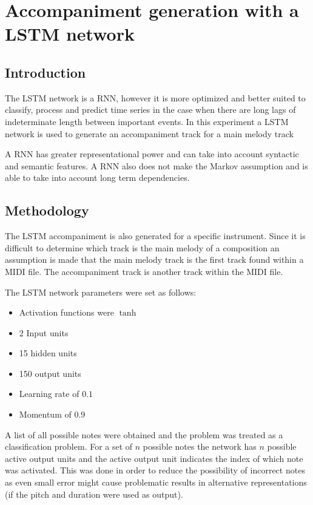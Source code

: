 \chapter{Accompaniment generation with a LSTM network} \label{ch:accomp_lstm}
\section{Introduction}
The \ac{LSTM} network is a \acf{RNN}, however it is more optimized and better suited to classify, process and predict time series in the case when there are long lags of indeterminate length between important events. In this experiment a \ac{LSTM} network is used to generate an accompaniment track for a main melody track

A \ac{RNN} has greater representational power and can take into account syntactic and semantic features. A \ac{RNN} also does not make the Markov assumption and is able to take into account long term dependencies.

\section{Methodology}
The \ac{LSTM} accompaniment is also generated for a specific instrument. 
Since it is difficult to determine which track is the main melody of a composition an assumption is made that the main melody track is the first track found within a \ac{MIDI} file. The accompaniment track is another track within the \ac{MIDI} file.

The LSTM network parameters were set as follows:
\begin{itemize}
\item Activation functions were $\tanh$
\item 2 Input units
\item 15 hidden units
\item 150 output units
\item Learning rate of $0.1$
\item Momentum of $0.9$
\end{itemize}

A list of all possible notes were obtained and the problem was treated as a classification problem. For a set of $n$ possible notes the network has $n$ possible active output units and the active output unit indicates the index of which note was activated. This was done in order to reduce the possibility of incorrect notes as even small error might cause problematic results in alternative representations (if the pitch and duration were used as output).

